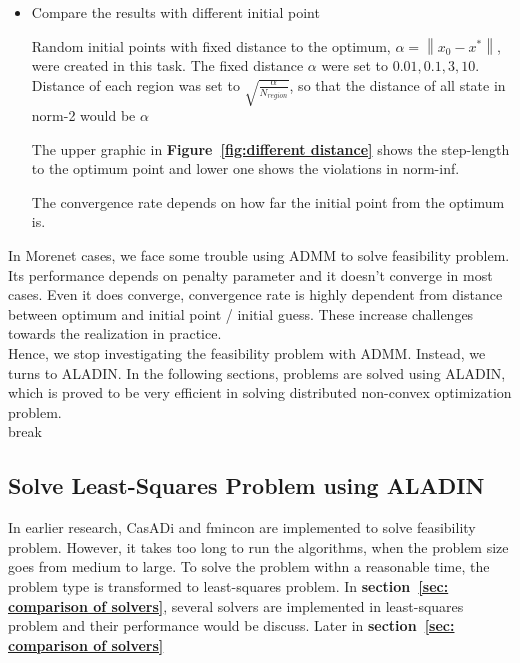 \documentclass{article}
\newcommand{\norm}[1]{\left\lVert#1\right\rVert}
\begin{document}
\begin{itemize}
        
    \item Compare the results with different initial point


        Random initial points with fixed distance to the optimum,  $\alpha = \norm{x_0-x^\ast}$, were created in this task. The fixed distance $\alpha$ were set to $0.01,0.1,3,10$. Distance of each region was set to $\sqrt{\frac{\alpha}{N_{region}}}$, so that the distance of all state in norm-2 would be  $\alpha$
        
        The upper graphic in \textbf{Figure~\ref{fig:different distance}} shows the step-length to the optimum point and lower one shows the violations in norm-inf.
        

        
        The convergence rate depends on how far the initial point from the optimum is.\break
        

        
\end{itemize}
\noindent In Morenet cases, we face some trouble using ADMM to solve feasibility problem. Its performance depends on penalty parameter and it doesn't converge in most cases. Even it does converge, convergence rate is highly dependent from distance between optimum and initial point / initial guess. These increase challenges towards the realization in practice. \\

\noindent Hence, we stop investigating the feasibility problem with ADMM. Instead, we turns to ALADIN. In the following sections, problems are solved using ALADIN, which is proved to be very efficient in solving distributed non-convex  optimization problem.\\break
\newpage

\subsection{Solve Least-Squares Problem using ALADIN}

In earlier research, CasADi and fmincon are implemented to solve feasibility problem. However, it takes too long to run the algorithms, when the problem size goes from medium to large. To solve the problem withn a reasonable time, the problem type is transformed to least-squares problem. In \textbf{section~\ref{sec: comparison of solvers}}, several solvers are implemented in least-squares problem and their performance would be discuss. Later in \textbf{section~\ref{sec: comparison of solvers}}
\end{document}
